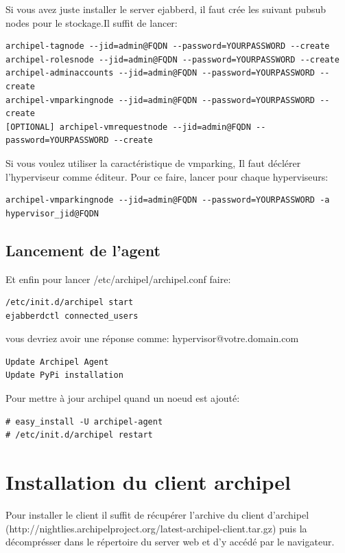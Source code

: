 Si vous avez juste installer le server ejabberd, il faut crée les suivant pubsub nodes pour le stockage.Il suffit de lancer:
\begin{lstlisting}
archipel-tagnode --jid=admin@FQDN --password=YOURPASSWORD --create
archipel-rolesnode --jid=admin@FQDN --password=YOURPASSWORD --create
archipel-adminaccounts --jid=admin@FQDN --password=YOURPASSWORD --create
archipel-vmparkingnode --jid=admin@FQDN --password=YOURPASSWORD --create
[OPTIONAL] archipel-vmrequestnode --jid=admin@FQDN --password=YOURPASSWORD --create
\end{lstlisting}

Si vous voulez utiliser la caractéristique de vmparking, Il faut déclérer l'hyperviseur comme éditeur. 
Pour ce faire, lancer pour chaque hyperviseurs:
\begin{lstlisting}
archipel-vmparkingnode --jid=admin@FQDN --password=YOURPASSWORD -a hypervisor_jid@FQDN
\end{lstlisting}


\subsection{Lancement de l'agent}

Et enfin pour lancer /etc/archipel/archipel.conf faire:
\begin{lstlisting}
/etc/init.d/archipel start
ejabberdctl connected_users
\end{lstlisting}

vous devriez avoir une réponse comme: hypervisor@votre.domain.com
\begin{lstlisting}
Update Archipel Agent
Update PyPi installation
\end{lstlisting}

Pour mettre à jour archipel quand un noeud est ajouté:
\begin{lstlisting}
# easy_install -U archipel-agent
# /etc/init.d/archipel restart
\end{lstlisting}

\section{Installation du client archipel}
Pour installer le client il suffit de récupérer l'archive du client d'archipel\newline
(http://nightlies.archipelproject.org/latest-archipel-client.tar.gz)
puis la décomprésser dans le répertoire du server web et d'y accédé par le navigateur.
